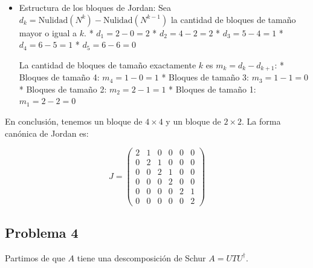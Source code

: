 \documentclass[11pt,spanish]{article}
\begin{document}
\begin{itemize}
Calculamos $N^3$:
$$N^3 = \begin{pmatrix} 0 & 0 & 0 & 0 & 0 & -1 \\ 0 & 0 & 0 & 0 & 0 & 0 \\ 0 & 0 & 0 & 0 & 0 & 1 \\ 0 & 0 & 0 & 0 & 0 & 0 \\ 0 & 0 & 0 & 0 & 0 & 0 \\ 0 & 0 & 0 & 0 & 0 & 0 \end{pmatrix}$$
Evidentemente, el $\text{Rango}(N^3) = 1 \implies \text{Nulidad}(N^3) = 5$.

Calculamos $N^4$:
$$N^4 = 0 \implies \text{Rango}(N^4) = 0 \implies \text{Nulidad}(N^4) = 6.$$

\item Estructura de los bloques de Jordan:
Sea $d_k = \text{Nulidad}(N^k) - \text{Nulidad}(N^{k-1})$ la cantidad de bloques de tamaño mayor o igual a $k$.
* $d_1 = 2 - 0 = 2$
* $d_2 = 4 - 2 = 2$
* $d_3 = 5 - 4 = 1$
* $d_4 = 6 - 5 = 1$
* $d_5 = 6 - 6 = 0$

La cantidad de bloques de tamaño exactamente $k$ es $m_k = d_k - d_{k+1}$:
* Bloques de tamaño 4: $m_4 = 1 - 0 = 1$
* Bloques de tamaño 3: $m_3 = 1 - 1 = 0$
* Bloques de tamaño 2: $m_2 = 2 - 1 = 1$
* Bloques de tamaño 1: $m_1 = 2 - 2 = 0$

\end{itemize}

En conclusión, tenemos un bloque de $4 \times 4$ y un bloque de $2 \times 2$. La forma canónica de Jordan es:

$$J = \begin{pmatrix} 2 & 1 & 0 & 0 & 0 & 0 \\ 0 & 2 & 1 & 0 & 0 & 0 \\ 0 & 0 & 2 & 1 & 0 & 0 \\ 0 & 0 & 0 & 2 & 0 & 0 \\ 0 & 0 & 0 & 0 & 2 & 1 \\ 0 & 0 & 0 & 0 & 0 & 2 \end{pmatrix}$$

\subsection*{Problema 4}

Partimos de que $A$ tiene una descomposición de Schur $A = U T U^\dagger$.
\end{document}
